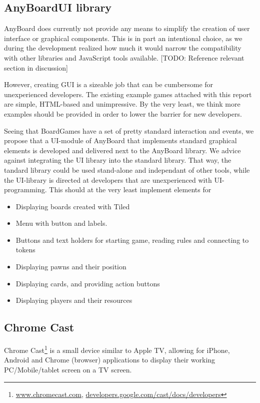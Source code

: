 \subsection{AnyBoardUI library}
AnyBoard does currently not provide any means to simplify the creation of user interface or graphical components. This is in part an intentional choice, as we during the development realized how much it would narrow the compatibility with other libraries and JavaScript tools available. [TODO: Reference relevant section in discussion]

However, creating GUI is a sizeable job that can be cumbersome for unexperienced developers. The existing example games attached with this report are simple, HTML-based and unimpressive. By the very least, we think more examples should be provided in order to lower the barrier for new developers. 

Seeing that BoardGames have a set of pretty standard interaction and events, we propose that a UI-module of AnyBoard that implements standard graphical elements is developed and delivered next to the AnyBoard library. We advice against integrating the UI library into the standard library. That way, the tandard library could be used stand-alone and independant of other tools, while the UI-library is directed at developers that are unexperienced with UI-programming. This should at the very least implement elements for 
\begin{itemize}
\item Displaying boards created with Tiled
\item Menu with button and labels.
\item Buttons and text holders for starting game, reading rules and connecting to tokens
\item Displaying pawns and their position 
\item Displaying cards, and providing action buttons
\item Displaying players and their resources
\end{itemize}

\subsection{Chrome Cast}
Chrome Cast\footnote{\href{http://www.chromecast.com}{www.chromecast.com}, \href{https://developers.google.com/cast/docs/developers}{developers.google.com/cast/docs/developers}} is a small device similar to Apple TV, allowing for iPhone, Android and Chrome (browser) applications to display their working PC/Mobile/tablet screen on a TV screen. 

